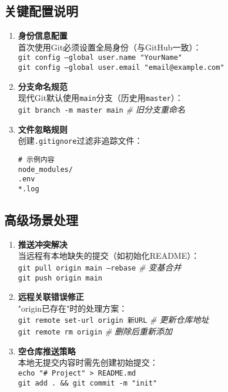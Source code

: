 \subsection{关键配置说明}
\begin{enumerate}[leftmargin=*, nosep]
\item \textbf{身份信息配置}\\
首次使用Git必须设置全局身份（与GitHub一致）：\\
\texttt{git config --global user.name "YourName"} \\
\texttt{git config --global user.email "email@example.com"}

\item \textbf{分支命名规范}\\
现代Git默认使用\texttt{main}分支（历史用\texttt{master}）：\\
\texttt{git branch -m master main} \quad \textit{\# 旧分支重命名}

\item \textbf{文件忽略规则}\\
创建\texttt{.gitignore}过滤非追踪文件：
\begin{verbatim}
# 示例内容
node_modules/
.env
*.log
\end{verbatim}
\end{enumerate}

\subsection{高级场景处理}
\begin{enumerate}[leftmargin=*, nosep]
\item \textbf{推送冲突解决}\\
当远程有本地缺失的提交（如初始化README）：\\
\texttt{git pull origin main --rebase} \quad \textit{\# 变基合并} \\
\texttt{git push origin main}

\item \textbf{远程关联错误修正}\\
"origin已存在"时的处理方案：\\
\texttt{git remote set-url origin 新URL} \quad \textit{\# 更新仓库地址} \\
\texttt{git remote rm origin} \quad \textit{\# 删除后重新添加}

\item \textbf{空仓库推送策略}\\
本地无提交内容时需先创建初始提交：\\
\texttt{echo "\# Project" > README.md} \\
\texttt{git add . \&\& git commit -m "init"}
\end{enumerate}

